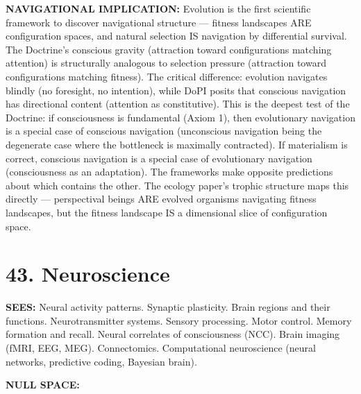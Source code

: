 \textbf{NAVIGATIONAL IMPLICATION:} Evolution is the first scientific framework to discover navigational structure — fitness landscapes ARE configuration spaces, and natural selection IS navigation by differential survival. The Doctrine's conscious gravity (attraction toward configurations matching attention) is structurally analogous to selection pressure (attraction toward configurations matching fitness). The critical difference: evolution navigates blindly (no foresight, no intention), while DoPI posits that conscious navigation has directional content (attention as constitutive). This is the deepest test of the Doctrine: if consciousness is fundamental (Axiom 1), then evolutionary navigation is a special case of conscious navigation (unconscious navigation being the degenerate case where the bottleneck is maximally contracted). If materialism is correct, conscious navigation is a special case of evolutionary navigation (consciousness as an adaptation). The frameworks make opposite predictions about which contains the other. The ecology paper's trophic structure maps this directly — perspectival beings ARE evolved organisms navigating fitness landscapes, but the fitness landscape IS a dimensional slice of configuration space.


\bigskip\noindent\makebox[\textwidth]{\color{rulegray}\rule{5cm}{0.3pt}}\bigskip


\section*{43. Neuroscience}


\textbf{SEES:} Neural activity patterns. Synaptic plasticity. Brain regions and their functions. Neurotransmitter systems. Sensory processing. Motor control. Memory formation and recall. Neural correlates of consciousness (NCC). Brain imaging (fMRI, EEG, MEG). Connectomics. Computational neuroscience (neural networks, predictive coding, Bayesian brain).


\textbf{NULL SPACE:}

